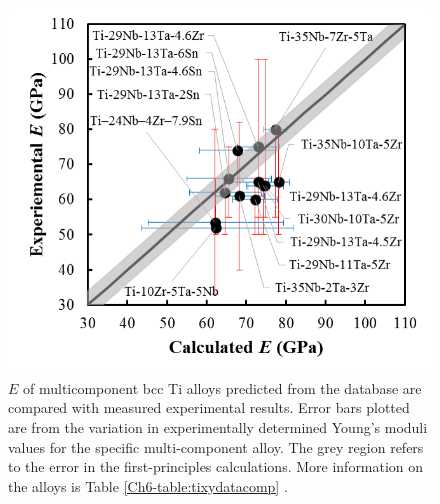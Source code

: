 \pagebreak
\begin{figure}[H]
	\centering
	\includegraphics{Chapter-6/Figures/tixydatabase.png}
	\caption{$E$ of multicomponent bcc Ti alloys predicted from the database are compared with measured experimental results. Error bars plotted are from the variation in experimentally determined Young's moduli values for the specific multi-component alloy. The grey region refers to the error in the first-principles calculations. More information on the alloys is Table \ref{Ch6-table:tixydatacomp} \cite{Mohammed2014,Geetha2009,Tane2010a}.}
	\label{Ch6-figure:tixydatabase}
\end{figure}